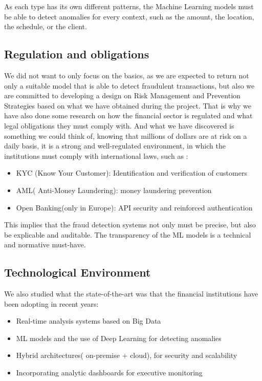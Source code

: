 \documentclass[12pt]{report} %
\begin{document}
As each type has its own different patterns, the Machine Learning models must be able to detect anomalies for every context, such as the amount, the location, the schedule, or the client.
\subsection{Regulation and obligations}
We did not want to only focus on the basics, as we are expected to return not only a suitable model that is able to detect fraudulent transactions, but also we are committed to developing a design on Risk Management and Prevention Strategies based on what we have obtained during the project. That is why we have also done some research on how the financial sector is regulated and what legal obligations they must comply with. And what we have discovered is something we could think of, knowing that millions of dollars are at risk on a daily basis, it is a strong and well-regulated environment, in which the institutions must comply with international laws, such as :
\begin{itemize}
    \item KYC (Know Your Customer): Identification and verification of customers
    \item AML( Anti-Money Laundering): money laundering prevention
    \item Open Banking(only in Europe): API security and reinforced authentication
\end{itemize}
This implies that the fraud detection systems not only must be precise, but also be explicable and auditable. The transparency of the ML models is a technical and normative must-have.

\subsection{Technological Environment}
We also studied what the state-of-the-art was that the financial institutions have been adopting in recent years:
\begin{itemize}
    \item Real-time analysis systems based on Big Data
    \item ML models and the use of Deep Learning for detecting anomalies 
    \item Hybrid architectures( on-premise + cloud), for security and scalability
    \item Incorporating analytic dashboards for executive monitoring 
\end{itemize}
\end{document}
